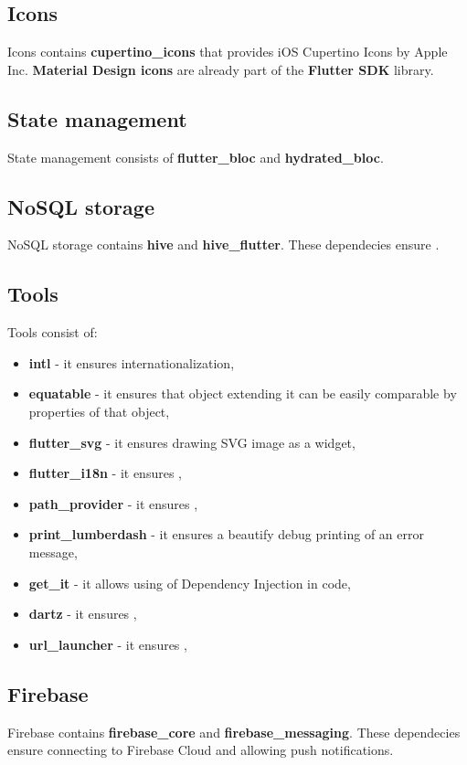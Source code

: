 \subsection{Icons}\label{subsec:icons}
Icons contains \textbf{cupertino\_icons} that provides iOS Cupertino Icons by Apple Inc.
\textbf{Material Design icons} are already part of the \textbf{Flutter SDK} library.

\subsection{State management}\label{subsec:state-management}
State management consists of \textbf{flutter\_bloc} and \textbf{hydrated\_bloc}.

\subsection{NoSQL storage}\label{subsec:nosql-storage}
NoSQL storage contains \textbf{hive} and \textbf{hive\_flutter}.
These dependecies ensure .%

\subsection{Tools}\label{subsec:tools}
Tools consist of: %
\begin{itemize}
    \item \textbf{intl} - it ensures internationalization,
    \item \textbf{equatable} - it ensures that object extending it can be easily comparable by properties of that object,
    \item \textbf{flutter\_svg} - it ensures drawing SVG image as a widget,
    \item \textbf{flutter\_i18n} - it ensures ,
    \item \textbf{path\_provider} - it ensures ,
    \item \textbf{print\_lumberdash} - it ensures a beautify debug printing of an error message,
    \item \textbf{get\_it} - it allows using of Dependency Injection in code,
    \item \textbf{dartz} - it ensures ,
    \item \textbf{url\_launcher} - it ensures ,
\end{itemize}

\subsection{Firebase}\label{subsec:firebase}
Firebase contains \textbf{firebase\_core} and \textbf{firebase\_messaging}.
These dependecies ensure connecting to Firebase Cloud and allowing push notifications.

